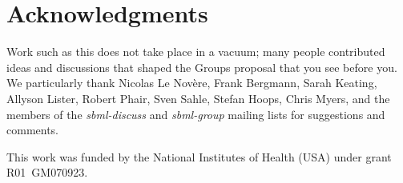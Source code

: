 
\section{Acknowledgments}

Work such as this does not take place in a vacuum; many people contributed ideas and discussions that shaped the Groups proposal that you see before you.  We particularly thank Nicolas Le Nov\`{e}re, Frank Bergmann, Sarah Keating, Allyson Lister, Robert Phair, Sven Sahle, Stefan Hoops, Chris Myers, and the members of the \emph{sbml-discuss} and \emph{sbml-group} mailing lists for suggestions and comments.

This work was funded by the National Institutes of Health (USA) under grant R01~GM070923.
